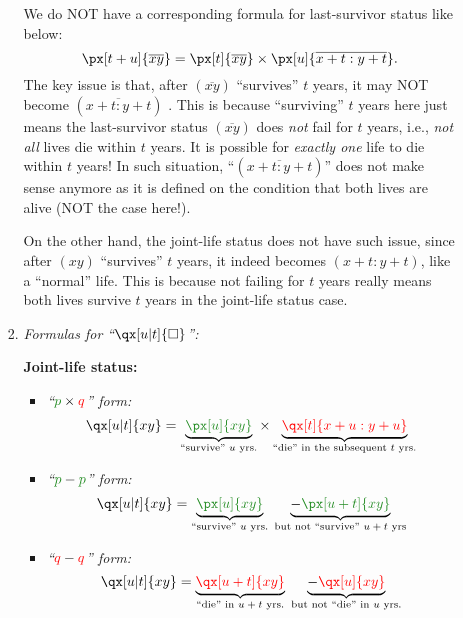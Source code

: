 \begin{enumerate}
\begin{enumerate}[label={(\arabic*)}]
\begin{enumerate}[label={(\roman*)}]
\begin{warning}
We do NOT have a corresponding formula for last-survivor status like below:
\[\px[t+u]{\overline{xy}}
=\px[t]{\overline{xy}}\times 
\px[u]{\overline{x+t:y+t}}.\]
The key issue is that, after \((\overline{xy})\) ``survives'' \(t\) years, it
may NOT become \((\overline{x+t\!:\!y+t})\) \warn{}. This is because
``surviving'' \(t\) years here just means the last-survivor status
\((\overline{xy})\) does \emph{not} fail for \(t\) years, i.e., \emph{not all}
lives die within \(t\) years. It is possible for \emph{exactly one} life to die
 within \(t\) years! In such situation,
``\((\overline{x+t\!:\!y+t})\)'' does not make sense anymore as it is defined
on the condition that both lives are alive (NOT the case here!).

On the other hand, the joint-life status does not have such issue, since after
\((xy)\) ``survives'' \(t\) years, it indeed becomes
\((x+t\!:\!y+t)\), like a ``normal'' life. This is because not
failing for \(t\) years really means both lives survive \(t\) years in the
joint-life status case.
\end{warning}
\item \emph{Formulas for ``\(\qx[u|t]{\square}\)'':}

\textbf{Joint-life status:}
\begin{itemize}
\item \emph{``\(\gc{p}\times \rc{q}\)'' form:} 
\[\qx[u|t]{xy}=\underbrace{\gc{\px[u]{xy}}}_{\text{``survive'' \(u\) yrs.}}
\times \underbrace{\rc{\qx[t]{x+u:y+u}}}_{\text{``die'' in the subsequent \(t\) yrs.}}\]
\item \emph{``\(\gc{p}-\gc{p}\)'' form:}
\[
\qx[u|t]{xy}=\underbrace{\gc{\px[u]{xy}}}_{\text{``survive'' \(u\) yrs.}}
\;\underbrace{-\gc{\px[u+t]{xy}}}_{\text{but not ``survive'' \(u+t\) yrs}}
\]
\item \emph{``\({\color{red}q}-{\color{red}q}\)'' form:}
\[
\qx[u|t]{xy}=\underbrace{\rc{\qx[u+t]{xy}}}_{\text{``die'' in \(u+t\) yrs.}}\;
\underbrace{-\rc{\qx[u]{xy}}}_{\text{but not ``die'' in \(u\) yrs.}}
\]
\end{itemize}


\end{enumerate}
\end{enumerate}
\end{enumerate}
